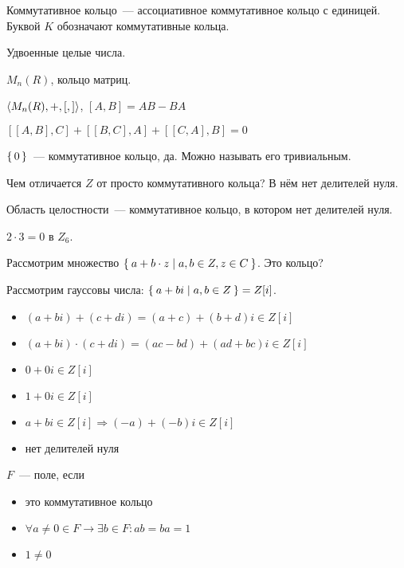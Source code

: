 \begin{define*}
  Коммутативное кольцо~--- ассоциативное коммутативное кольцо с единицей. Буквой $K$ обозначают коммутативные кольца.
\end{define*}

\begin{example}
  Удвоенные целые числа.
\end{example}

\begin{example}
  $M_n(R)$, кольцо матриц.  
\end{example}

\begin{example}
  $\braket{M_n(R), +, [,]}$, $[A,B] = AB-BA$
  
  $[[A,B],C] + [[B,C],A] + [[C,A],B] = 0$
\end{example}

\begin{example}
  $\set{0}$~--- коммутативное кольцо, да. Можно называть его тривиальным.
\end{example}

Чем отличается $Z$ от просто коммутативного кольца? В нём нет делителей нуля.

\begin{define*}
  Область целостности~--- коммутативное кольцо, в котором нет делителей нуля.
\end{define*}

\begin{example}
    $2\cdot3 = 0$ в $Z_6$.
\end{example}

Рассмотрим множество $\Set{a+b\cdot z | a,b \in Z, z \in C}$. Это кольцо?

Рассмотрим гауссовы числа: $\Set{a+bi | a,b \in Z} = Z[i]$.

\begin{itemize}
    \item $(a+bi)+(c+di) = (a+c)+ (b+d)i \in Z[i]$
    \item $(a+bi)\cdot(c+di) = (ac-bd) + (ad+bc)i \in Z[i]$
    \item $0 + 0i \in Z[i]$
    \item $1 + 0i \in Z[i]$
    \item $a+bi \in Z[i] \Rightarrow (-a) + (-b)i \in Z[i]$
    \item нет делителей нуля
\end{itemize}

\begin{define*}
  $F$~--- поле, если
  \begin{itemize}
    \item это коммутативное кольцо
      \item $\forall a\ne 0 \in F \rightarrow \exists b \in F : ab = ba = 1$
      \item $1 \ne 0$
  \end{itemize}
\end{define*}


